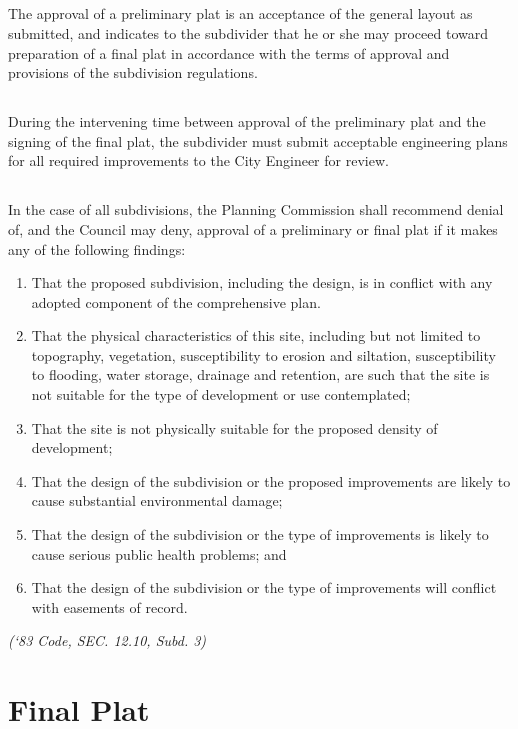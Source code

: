 \subsection{}
The approval of a preliminary plat is an acceptance of the general layout as submitted, and indicates to the subdivider that he or she may proceed toward preparation of a final plat in accordance with the terms of approval and provisions of the subdivision regulations.
\subsection{}
During the intervening time between approval of the preliminary plat and the signing of the final plat, the subdivider must submit acceptable engineering plans for all required improvements to the City Engineer for review.
\subsection{}
In the case of all subdivisions, the Planning Commission shall recommend denial of, and the Council may deny, approval of a preliminary or final plat if it makes any of the following findings:
\begin{enumerate}[{\indent}1)]
    \item That the proposed subdivision, including the design, is in conflict with any adopted component of the comprehensive plan.
    \item That the physical characteristics of this site, including but not limited to topography, vegetation, susceptibility to erosion and siltation, susceptibility to flooding, water storage, drainage and retention, are such that the site is not suitable for the type of development or use contemplated;
    \item That the site is not physically suitable for the proposed density of development;
    \item That the design of the subdivision or the proposed improvements are likely to cause substantial environmental damage;
    \item That the design of the subdivision or the type of improvements is likely to cause serious public health problems; and
    \item That the design of the subdivision or the type of improvements will conflict with easements of record.
\end{enumerate}
\emph{(‘83 Code, SEC. 12.10, Subd. 3)}
\section{Final Plat}
